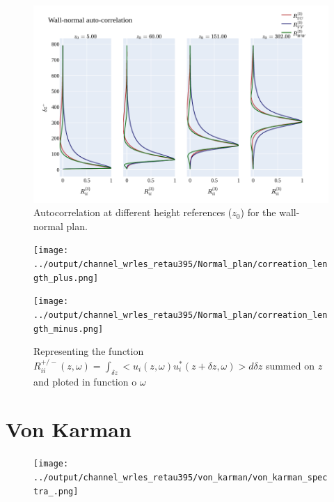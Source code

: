 \documentclass[]{article}
\theoremstyle{plain}
\theoremstyle{remark}
\begin{document}
\begin{figure}[h!]
	\begin{center}
		\includegraphics[width=\textwidth]{../output/channel_wrles_retau395/Normal_plan/autocorreation_z.png}
		\caption{Autocorrelation at different height references ($z_0$) for the wall-normal plan.}
	\end{center}
\end{figure}

\begin{figure}[h!]
	\begin{center}
		\texttt{[image: ../output/channel\_wrles\_retau395/Normal\_plan/correation\_length\_plus.png]}
	\end{center}
\end{figure}

\begin{figure}[h!]
	\begin{center}
		\texttt{[image: ../output/channel\_wrles\_retau395/Normal\_plan/correation\_length\_minus.png]}
		\caption{Representing the function $R_{ii}^{+/-}(z,\omega)=\int_{\delta z}<u_i(z,\omega)u_i^*(z+\delta z, \omega)>d\delta z$ summed on $z$ and ploted in function o $\omega$}
	\end{center}
\end{figure}

\section{Von Karman}

\begin{figure}[h!]
	\begin{center}
		\texttt{[image: ../output/channel\_wrles\_retau395/von\_karman/von\_karman\_spectra\_.png]}
	\end{center}
\end{figure}
\end{document}
